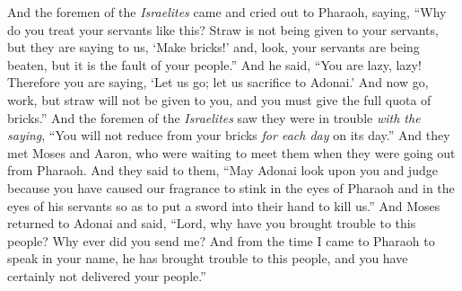 \begin{biblechapter}
 And the foremen of the \textit{Israelites} came and cried out to Pharaoh, saying, “Why do you treat your servants like this?
\verse Straw is not being given to your servants, but they are saying to us, ‘Make bricks!’ and, look, your servants are being beaten, but it is the fault of your people.”
\verse And he said, “You are lazy, lazy! Therefore you are saying, ‘Let us go; let us sacrifice to Adonai.’
\verse And now go, work, but straw will not be given to you, and you must give the full quota of bricks.”
\verse And the foremen of the \textit{Israelites} saw they were in trouble \textit{with the saying}, “You will not reduce from your bricks \textit{for each day} on its day.”
\verse And they met Moses and Aaron, who were waiting to meet them when they were going out from Pharaoh.
\verse And they said to them, “May Adonai look upon you and judge because you have caused our fragrance to stink in the eyes of Pharaoh and in the eyes of his servants so as to put a sword into their hand to kill us.”
\verse And Moses returned to Adonai and said, “Lord, why have you brought trouble to this people? Why ever did you send me?
\verse And from the time I came to Pharaoh to speak in your name, he has brought trouble to this people, and you have certainly not delivered your people.”
\end{biblechapter}

